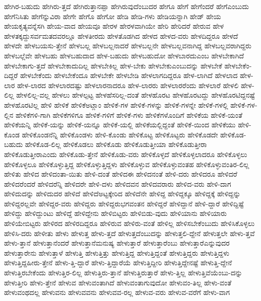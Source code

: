 {ಹೇಗಿರ-ಬಹುದು
ಹೇಗಿರು-ತ್ತದೆ
ಹೇಗಿರುತ್ತಾನಪ್ಪಾ
ಹೇಗಿರುವುದೆಂಬುದರ
ಹೇಗೂ
ಹೇಗೆ
ಹೇಗೆಂದರೆ
ಹೇಗೆಎಂಬುದು
ಹೇಗೆನಿಸಿತು
ಹೇಗೆನ್ನುವಿರಾ
ಹೇಗೇ
ಹೇಗೊ
ಹೇಗೋ
ಹೇಡಿ
ಹೇಡಿ-ಗಳು
ಹೇಡಿಯನ್ನಾಗಿ
ಹೇಡ್
ಹೇಯ
ಹೇಯಕೃತ್ಯವನ್ನೆಸಗಿ
ಹೇಯ-ವಾದ
ಹೇಯವೂ
ಹೇರಳ
ಹೇರಳವಾಗಿಯೇ
ಹೇರಿ
ಹೇರಿದರೆ
ಹೇರುವ
ಹೇಳ
ಹೇಳತಕ್ಕದ್ದುಸರ್ವಮತದವರಲ್ಲೂ
ಹೇಳತೀರದು
ಹೇಳತೊಡಗಿದ
ಹೇಳದ
ಹೇಳದ-ವರು
ಹೇಳದಿದ್ದರೂ
ಹೇಳದೆ
ಹೇಳದೇ
ಹೇಳಬಯಸು-ತ್ತೇನೆ
ಹೇಳಬಲ್ಲ
ಹೇಳಬಲ್ಲನಾದರೆ
ಹೇಳಬಲ್ಲನೇ
ಹೇಳಬಲ್ಲವನಾಗಿದ್ದ
ಹೇಳಬಲ್ಲವರಾಗಿದ್ದರು
ಹೇಳಬಲ್ಲೆವೇ
ಹೇಳಬಹು
ಹೇಳಬಹುದಾದ
ಹೇಳ-ಬಹುದು
ಹೇಳಬಹುದೋ
ಹೇಳಬಾರದುಎಂಬ
ಹೇಳಬೇಕಾಗಿದೆ
ಹೇಳಬೇಕಾಗು-ತ್ತದೆ
ಹೇಳಬೇಕಾದುದಿಲ್ಲ
ಹೇಳಬೇಕಿಲ್ಲ
ಹೇಳ-ಬೇಕು
ಹೇಳಬೇಕುಎಂಬುದನ್ನು
ಹೇಳಬೇಕೆ
ಹೇಳಬೇಕೆಂ-ದಿದ್ದರೆ
ಹೇಳಬೇಕೆಂದು
ಹೇಳಬೇಕೆಂದೂ
ಹೇಳಬೇಕೇ
ಹೇಳಬೇಡಿ
ಹೇಳಲಾಗದಿದ್ದರೂ
ಹೇಳ-ಲಾಗಿದೆ
ಹೇಳಲಾದ
ಹೇಳ-ಲಾರ
ಹೇಳ-ಲಾರದ
ಹೇಳಲಾರದಷ್ಟು
ಹೇಳಲಾರನಾದರೂ
ಹೇಳ-ಲಾರರು
ಹೇಳಲಾರರೆಂದು
ಹೇಳಲಾರೆ
ಹೇಳಲಿ
ಹೇಳ-ಲಿಲ್ಲ
ಹೇಳಲಿಲ್ಲ-ವಲ್ಲ
ಹೇಳಲು
ಹೇಳಲ್ಪಟ್ಟ
ಹೇಳಹೆಸರಿಲ್ಲ-ದಂತೆ
ಹೇಳಹೊರಟ
ಹೇಳಹೊರಟದ್ದು
ಹೇಳಹೊರಟಿದ್ದನಷ್ಟೆ
ಹೇಳಹೊರಟಿಲ್ಲ
ಹೇಳಿ
ಹೇಳಿಕೆ
ಹೇಳಿಕೆಅಟ್ಲಾಂ
ಹೇಳಿಕೆ-ಗಳ
ಹೇಳಿಕೆ-ಗಳನ್ನು
ಹೇಳಿಕೆ-ಗಳನ್ನೇ
ಹೇಳಿಕೆ-ಗಳಲ್ಲಿ
ಹೇಳಿಕೆ-ಗಳ-ಲ್ಲಿನ
ಹೇಳಿಕೆಗಳಿ-ಗಾಗಿ
ಹೇಳಿಕೆಗಳಿಗೂ
ಹೇಳಿಕೆ-ಗಳಿಗೆ
ಹೇಳಿಕೆ-ಗಳು
ಹೇಳಿಕೆಗಳೊಂದಿಗೆ
ಹೇಳಿಕೆಯ
ಹೇಳಿಕೆ-ಯಂತೆ
ಹೇಳಿಕೆಯನ್ನಿ
ಹೇಳಿಕೆ-ಯನ್ನು
ಹೇಳಿಕೆ-ಯನ್ನೂ
ಹೇಳಿಕೆ-ಯಲ್ಲಿ
ಹೇಳಿಕೆಯಲ್ಲಿದ್ದಂತೆ
ಹೇಳಿಕೆ-ಯಿಂದ
ಹೇಳಿಕೆಯು
ಹೇಳಿ-ಕೊಂಡ
ಹೇಳಿಕೊಂಡನೆನ್ನಿ
ಹೇಳಿಕೊಂಡಳು
ಹೇಳಿ-ಕೊಂಡು
ಹೇಳಿಕೊಟ್ಟ
ಹೇಳಿಕೊಟ್ಟರು
ಹೇಳಿಕೊಡದೇ
ಹೇಳಿಕೊಡ-ಬಹುದು
ಹೇಳಿಕೊಡ-ಲಿಲ್ಲ
ಹೇಳಿಕೊಡಲು
ಹೇಳಿಕೊಡು
ಹೇಳಿಕೊಡುತ್ತೀಯಾ
ಹೇಳಿಕೊಡುತ್ತೀರಾ
ಹೇಳಿಕೊಡುತ್ತೀರಾಎಂದು
ಹೇಳಿಕೊಡು-ತ್ತೇನೆ
ಹೇಳಿಕೊಡು-ವರು
ಹೇಳಿಕೊಳ್ಳದೆ
ಹೇಳಿಕೊಳ್ಳಲಾದರೂ
ಹೇಳಿಕೊಳ್ಳಲು
ಹೇಳಿಕೊಳ್ಳಲೂ
ಹೇಳಿಕೊಳ್ಳುತ್ತಿದ್ದ
ಹೇಳಿಕೊಳ್ಳುತ್ತಿದ್ದಳು
ಹೇಳಿಕೊಳ್ಳುವ
ಹೇಳಿಕೊಳ್ಳುವಂತಹ
ಹೇಳಿಕೊಳ್ಳುವಂತಿರ-ಲಿಲ್ಲ
ಹೇಳಿತು
ಹೇಳಿದ
ಹೇಳಿದಂತಾ-ಯಿತು
ಹೇಳಿ-ದಂತೆ
ಹೇಳಿದಈ
ಹೇಳಿದನಂತೆ
ಹೇಳಿ-ದರು
ಹೇಳಿದರೂ
ಹೇಳಿದರೆ
ಹೇಳಿದರೆಂದರೆ
ಹೇಳಿದರೆನ್ನಿ
ಹೇಳಿದರೇ
ಹೇಳಿ-ದಳು
ಹೇಳಿದವನ
ಹೇಳಿದವರಾರು
ಹೇಳಿದ-ವರು
ಹೇಳಿ-ದಾಗ
ಹೇಳಿದುದನ್ನು
ಹೇಳಿದುದರ
ಹೇಳಿದೆ
ಹೇಳಿದೆಅಟ್ಟಕ್ಕೇರಿದ
ಹೇಳಿದೆನೇ
ಹೇಳಿದ್ದ
ಹೇಳಿದ್ದಕ್ಕೂ
ಹೇಳಿದ್ದಕ್ಕೆ
ಹೇಳಿದ್ದನ್ನು
ಹೇಳಿದ್ದರಲ್ಲವೇ
ಹೇಳಿದ್ದರ-ವರು
ಹೇಳಿದ್ದರು
ಹೇಳಿದ್ದರುಭಗವಂತನ
ಹೇಳಿದ್ದರೆ
ಹೇಳಿದ್ದಾನೆ
ಹೇಳಿ-ದ್ದಾರೆ
ಹೇಳಿದ್ದಿಷ್ಟೆ
ಹೇಳಿದ್ದು
ಹೇಳಿದ್ದುಂಟು
ಹೇಳಿದ್ದೆ
ಹೇಳಿದ್ದೇನು
ಹೇಳಿಬಿಟ್ಟರು
ಹೇಳಿಬಿಡು-ವುದು
ಹೇಳಿಯಾನು
ಹೇಳಿಯಾರು
ಹೇಳಿಯೇಬಿಟ್ಟರು
ಹೇಳಿರದ
ಹೇಳಿರದಿದ್ದರೂ
ಹೇಳಿರುವ
ಹೇಳಿರು-ವಂತೆ
ಹೇಳಿಲ್ಲ
ಹೇಳಿಸಬೇಕೆಂಬುದು
ಹೇಳಿಸಿಕೊಳ್ಳಲು
ಹೇಳಿಸಿ-ದರು
ಹೇಳೀತು
ಹೇಳು
ಹೇಳುತ್ತ
ಹೇಳು-ತ್ತದೆ
ಹೇಳುತ್ತದೆಂಬುದನ್ನು
ಹೇಳುತ್ತಲಿ-ದ್ದೇನೆ
ಹೇಳುತ್ತಲೇ
ಹೇಳು-ತ್ತವೆ
ಹೇಳು-ತ್ತಾನೆ
ಹೇಳುತ್ತಾನೆಂದರೆ
ಹೇಳುತ್ತಾನೆಮನುಷ್ಯ
ಹೇಳುತ್ತಾರೆ
ಹೇಳುತ್ತಾರೆಂಬು
ಹೇಳುತ್ತಾರೆಎನ್ನುವುದರ
ಹೇಳುತ್ತಾರೇನು
ಹೇಳುತ್ತಾಳೆ
ಹೇಳುತ್ತಿ
ಹೇಳುತ್ತಿತ್ತು
ಹೇಳುತ್ತಿದ್ದ
ಹೇಳುತ್ತಿದ್ದಂತೆ
ಹೇಳುತ್ತಿದ್ದರು
ಹೇಳುತ್ತಿದ್ದಳು
ಹೇಳುತ್ತಿದ್ದಹೀರು-ತ್ತೇನೆ
ಹೇಳು-ತ್ತಿ-ದ್ದಾರೆ
ಹೇಳು-ತ್ತಿದ್ದಾರೆಯೆ
ಹೇಳುತ್ತಿದ್ದೀರಿ
ಹೇಳುತ್ತಿದ್ದೇನಷ್ಟೆ
ಹೇಳುತ್ತಿ-ದ್ದೇನೆ
ಹೇಳುತ್ತಿರಬೇಕೆಂದು
ಹೇಳುತ್ತಿರ-ಲಿಲ್ಲ
ಹೇಳುತ್ತಿರು-ತ್ತಾನೆ
ಹೇಳುತ್ತಿರುತ್ತಾರೆ
ಹೇಳು-ತ್ತಿಲ್ಲ
ಹೇಳುತ್ತಿವೆಯೆಂಬು-ದನ್ನು
ಹೇಳುತ್ತೀರಿ
ಹೇಳು-ತ್ತೇನೆ
ಹೇಳುವ
ಹೇಳುವಂತಾಗಿದೆ
ಹೇಳುವಂತಾಗುವುದೋ
ಹೇಳುವಂ-ತಿಲ್ಲ
ಹೇಳು-ವಂತೆ
ಹೇಳುವಂಥದಲ್ಲ
ಹೇಳುವನು
ಹೇಳುವವನು
ಹೇಳುವವ-ರಲ್ಲ
ಹೇಳುವ-ವರು
ಹೇಳುವ-ವರೆಗೆ
ಹೇಳು-ವಾಗ
}

